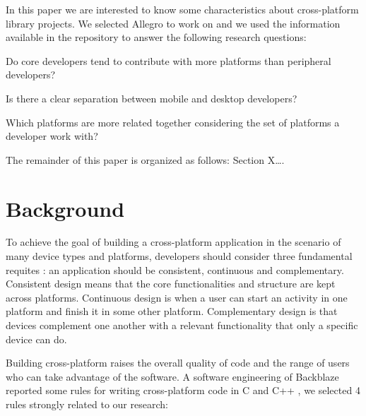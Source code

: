 \documentclass[10pt, conference]{IEEEtran}
\begin{document}
In this paper we are interested to know some characteristics about cross-platform library projects. We selected Allegro to work on and we used the information available in the repository to answer the following research questions:

\begin{RQ}
\item Do core developers tend to contribute with more platforms than peripheral developers?
\item Is there a clear separation between mobile and desktop developers?
\item  Which platforms are more related together considering the set of platforms a developer work with? 
\end{RQ}



The remainder of this paper is organized as follows: Section X…. 

\section{Background}

To achieve the goal of building a cross-platform application in the scenario of many device types and platforms, developers should consider three fundamental requites \cite{Levin2014}: an application should be consistent, continuous and complementary. Consistent design means that the core functionalities and structure are kept across platforms. Continuous design is when a user can start an activity in one platform and finish it in some other platform. Complementary design is that devices complement one another with a relevant functionality that only a specific device can do.   



Building cross-platform raises the overall quality of code and the range of users who can take advantage of the software\cite{backblaze2008}. A software engineering of Backblaze reported some rules for writing cross-platform code in C and C++ \cite{backblaze2008}, we selected 4 rules strongly related to our research:
\end{document}
